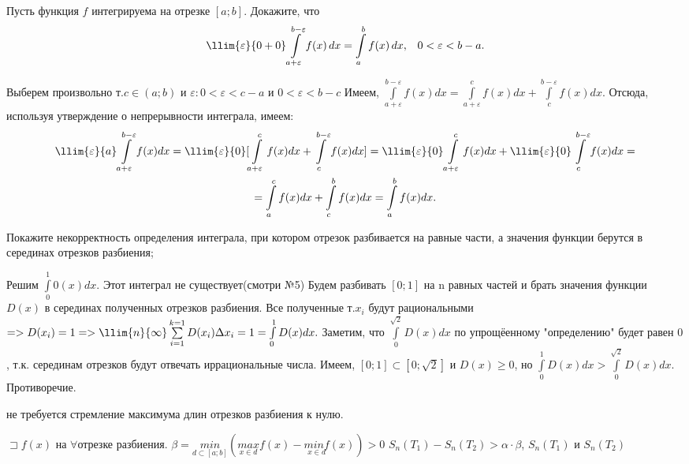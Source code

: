\documentclass[10pt]{article}
\begin{document}
\task Пусть функция $f$ интегрируема на отрезке $[a; b]$. Докажите, что
$$
\llim{\varepsilon}{0+0} \int\limits_{a + \varepsilon}^{b - \varepsilon} f(x) \, dx = \int\limits_a^b f(x) \, dx, \;\;\; 0 < \varepsilon < b - a.
$$

\begin{solution}
 Выберем произвольно т.$c\in(a;b)$ и $\varepsilon: 0<\varepsilon<c-a$ и $0<\varepsilon<b-c$
 \newline Имеем, $\int\limits_{a+\varepsilon}^{b-\varepsilon}f(x)dx=\int\limits_{a+\varepsilon}^c f(x)dx+\int\limits_{c}^{b-\varepsilon} f(x)dx$. Отсюда, используя утверждение о непрерывности интеграла, имеем:
\begin{multline*}
 \llim{\varepsilon}{a}\int\limits_{a+\varepsilon}^{b-\varepsilon}f(x)dx=\llim{\varepsilon}{0}[\int\limits_{a+\varepsilon}^c f(x)dx+\int\limits_c^{b-\varepsilon} f(x)dx]=\llim{\varepsilon}{0}\int\limits_{a+\varepsilon}^c f(x)dx+\llim{\varepsilon}{0}\int\limits_c^{b-\varepsilon} f(x)dx=\\=\int\limits_a^c f(x)dx+\int\limits_c^b f(x)dx=\int\limits_a^b f(x)dx.
\end{multline*}
\end{solution}

\task Покажите некорректность определения интеграла, при котором
\pnt \cw отрезок разбивается на равные части, а значения функции берутся в серединах отрезков разбиения;
\begin{solution}
  Решим $\int\limits_0^1 0(x)dx.$ Этот интеграл не существует(смотри №5)
  \newline Будем разбивать $[0;1]$ на n равных частей и брать значения функции $D(x)$ в серединах полученных отрезков разбиения. Все полученные т.$x_i$ будут рациональными $=>D(x_i)=1=>\llim{n}{\infty}\sum\limits_{i=1}^{k=1} D(x_i)\Delta x_i=1=\int\limits_0^1 D(x)dx.$
  \newline Заметим, что $\int\limits_0^{\sqrt{2}}D(x)dx$ по упрощёенному "определению" будет равен $0$, т.к. серединам отрезков будут отвечать иррациональные числа.
  \newline Имеем, $[0;1]\subset[0;\sqrt{2}]$ и $D(x)\geqslant0$, но $\int\limits_0^1D(x)dx>\int\limits_0^{\sqrt{2}}D(x)dx.$ Противоречие.
\end{solution}

\pnt не требуется стремление максимума длин отрезков разбиения к нулю.
\begin{solution}
  $\sqsupset f(x)$ на $\forall$отрезке разбиения.
  \newline $\beta=\underset{d\subset [a;b]}{min}(\underset{x\in d}{max}f(x)-\underset{x\in d}{minf}(x))>0$
  \newline $S_n(T_1)-S_n(T_2)>\alpha \cdot \beta$, $S_n(T_1)$ и $S_n(T_2)$
\end{solution}
\end{document}
